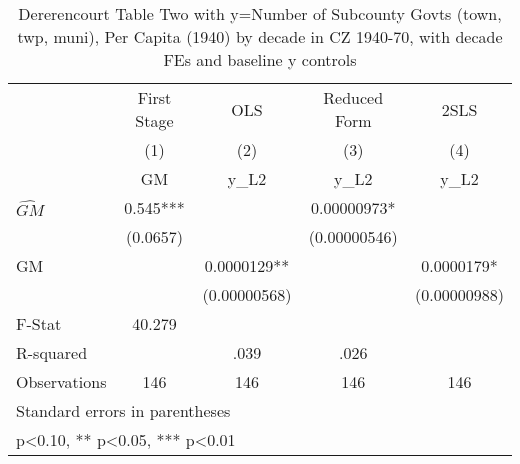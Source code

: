 \begin{table}[htbp]\centering
\def\sym#1{\ifmmode^{#1}\else\(^{#1}\)\fi}
\caption{Dererencourt Table Two with y=Number of Subcounty Govts (town, twp, muni), Per Capita (1940) by decade in CZ 1940-70, with decade FEs and baseline y controls}
\begin{tabular}{l*{4}{c}}
\toprule
                    & First Stage   &         OLS   &Reduced Form   &        2SLS   \\
                    &\multicolumn{1}{c}{(1)}&\multicolumn{1}{c}{(2)}&\multicolumn{1}{c}{(3)}&\multicolumn{1}{c}{(4)}\\
                    &\multicolumn{1}{c}{GM}&\multicolumn{1}{c}{y\_L2}&\multicolumn{1}{c}{y\_L2}&\multicolumn{1}{c}{y\_L2}\\
\midrule
$\hat{GM}$          &       0.545***&               &  0.00000973*  &               \\
                    &    (0.0657)   &               &(0.00000546)   &               \\
\addlinespace
GM                  &               &   0.0000129** &               &   0.0000179*  \\
                    &               &(0.00000568)   &               &(0.00000988)   \\
\midrule
F-Stat              &      40.279   &               &               &               \\
R-squared           &               &        .039   &        .026   &               \\
Observations        &         146   &         146   &         146   &         146   \\
\bottomrule
\multicolumn{5}{l}{\footnotesize Standard errors in parentheses}\\
\multicolumn{5}{l}{\footnotesize * p<0.10, ** p<0.05, *** p<0.01}\\
\end{tabular}
\end{table}
